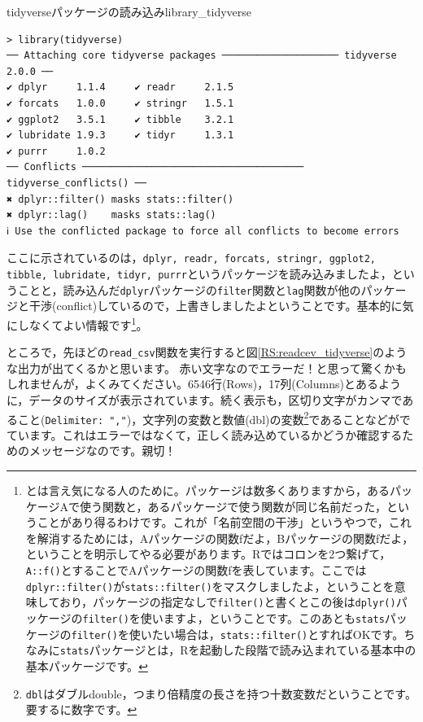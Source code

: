 \documentclass{ltjsbook}
\begin{document}
\begin{Rscreen}{tidyverseパッケージの読み込み}{library_tidyverse}
	\begin{verbatim}
> library(tidyverse)
── Attaching core tidyverse packages ──────────────────── tidyverse 2.0.0 ──
✔ dplyr     1.1.4     ✔ readr     2.1.5
✔ forcats   1.0.0     ✔ stringr   1.5.1
✔ ggplot2   3.5.1     ✔ tibble    3.2.1
✔ lubridate 1.9.3     ✔ tidyr     1.3.1
✔ purrr     1.0.2     
── Conflicts ────────────────────────────────────── tidyverse_conflicts() ──
✖ dplyr::filter() masks stats::filter()
✖ dplyr::lag()    masks stats::lag()
ℹ Use the conflicted package to force all conflicts to become errors
\end{verbatim}
\end{Rscreen}
ここに示されているのは，\verb|dplyr, readr, forcats, stringr, ggplot2, tibble, lubridate, tidyr, purrr|というパッケージを読み込みましたよ，ということと，読み込んだ\verb|dplyr|パッケージの\verb|filter|関数と\verb|lag|関数が他のパッケージと干渉(conflict)しているので，上書きしましたよということです。基本的に気にしなくてよい情報です\footnote{とは言え気になる人のために。パッケージは数多くありますから，あるパッケージAで使う関数と，あるパッケージで使う関数が同じ名前だった，ということがあり得るわけです。これが「名前空間の干渉」というやつで，これを解消するためには，Aパッケージの関数fだよ，Bパッケージの関数fだよ，ということを明示してやる必要があります。Rではコロンを2つ繋げて，\verb|A::f()|とすることでAパッケージの関数fを表しています。ここでは\verb|dplyr::filter()|が\verb|stats::filter()|をマスクしましたよ，ということを意味しており，パッケージの指定なしで\verb|filter()|と書くとこの後は\verb|dplyr()|パッケージの\verb|filter()|を使いますよ，ということです。このあとも\verb|stats|パッケージの\verb|filter()|を使いたい場合は，\verb|stats::filter()|とすればOKです。ちなみに\verb|stats|パッケージとは，Rを起動した段階で読み込まれている基本中の基本パッケージです。}。

ところで，先ほどの\verb|read_csv|関数を実行すると図\ref{RS:readcev_tidyverse}のような出力が出てくるかと思います。
赤い文字なのでエラーだ！と思って驚くかもしれませんが，よくみてください。6546行(Rows)，17列(Columns)とあるように，データのサイズが表示されています。続く表示も，区切り文字がカンマであること(\verb|Delimiter: ","|)，文字列の変数と数値(dbl)の変数\footnote{\verb|dbl|はダブルdouble，つまり倍精度の長さを持つ十数変数だということです。要するに数字です。}であることなどがでています。これはエラーではなくて，正しく読み込めているかどうか確認するためのメッセージなのです。親切！
\end{document}
